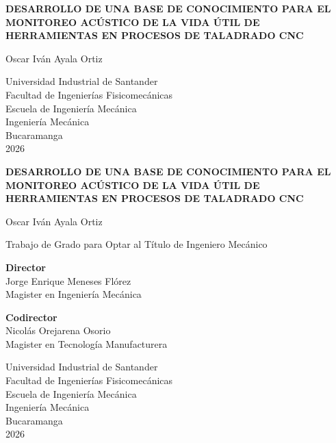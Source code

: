 \documentclass[12pt, letterpaper]{report}
\begin{document}
\begin{titlepage}
\thispagestyle{empty}
\begin{center}
\vspace*{2cm}
{\normalsize\textbf{DESARROLLO DE UNA BASE DE CONOCIMIENTO PARA EL MONITOREO ACÚSTICO DE LA VIDA ÚTIL DE HERRAMIENTAS EN PROCESOS DE TALADRADO CNC}}\par
\vspace{4cm}
{\normalsize Oscar Iván Ayala Ortiz}\par
\vfill
{\normalsize Universidad Industrial de Santander\\
Facultad de Ingenierías Fisicomecánicas\\
Escuela de Ingeniería Mecánica\\
Ingeniería Mecánica\\
Bucaramanga\\
2026}
\end{center}
\end{titlepage}


\begin{titlepage}
\thispagestyle{empty}
\begin{center}
\vspace*{2cm}
{\normalsize\textbf{DESARROLLO DE UNA BASE DE CONOCIMIENTO PARA EL MONITOREO ACÚSTICO DE LA VIDA ÚTIL DE HERRAMIENTAS EN PROCESOS DE TALADRADO CNC}}\par
\vspace{2cm}
{\normalsize Oscar Iván Ayala Ortiz}\par
\vspace{2cm}
{\normalsize Trabajo de Grado para Optar al Título de Ingeniero Mecánico}\par
\vspace{2cm}
{\normalsize \textbf{Director}\\
Jorge Enrique Meneses Flórez\\
Magister en Ingeniería Mecánica}\par
\vspace{1cm}
{\normalsize \textbf{Codirector}\\
Nicolás Orejarena Osorio\\
Magister en Tecnología Manufacturera}\par
\vfill
{\normalsize Universidad Industrial de Santander\\
Facultad de Ingenierías Fisicomecánicas\\
Escuela de Ingeniería Mecánica\\
Ingeniería Mecánica\\
Bucaramanga\\
2026}
\end{center}
\end{titlepage}
\end{document}

